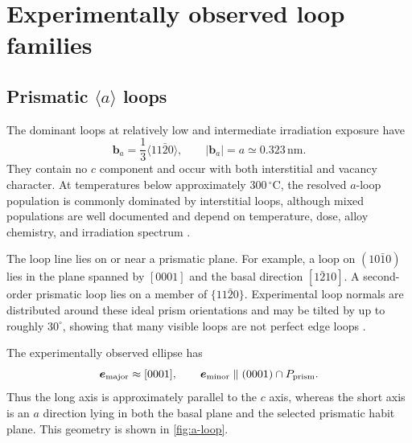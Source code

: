 \documentclass[11pt]{article}
\newcommand{\bvec}{\bm b}
\newcommand{\SI}[2]{\ensuremath{#1\,#2}}
\newcommand{\meter}{\mathrm{m}}
\newcommand{\nano}{\mathrm{n}}
\newcommand{\celsius}{^{\circ}\mathrm{C}}
\begin{document}
\section{Experimentally observed loop families}

\subsection{Prismatic $\langle a\rangle$ loops}

The dominant loops at relatively low and intermediate irradiation exposure have
\begin{equation}
 \bvec_a=\frac13\langle11\bar20\rangle,
 \qquad |\bvec_a|=a\simeq\SI{0.323}{\nano\meter}.
 \label{eq:a-burgers}
\end{equation}
They contain no $c$ component and occur with both interstitial and vacancy character. At temperatures below approximately \SI{300}{\celsius}, the resolved $a$-loop population is commonly dominated by interstitial loops, although mixed populations are well documented and depend on temperature, dose, alloy chemistry, and irradiation spectrum \citep{Jostsons1977Nature,Northwood1979RoundRobin,Liu2020Platelets}.

The loop line lies on or near a prismatic plane. For example, a loop on $(10\bar10)$ lies in the plane spanned by $[0001]$ and the basal direction $[1\bar210]$. A second-order prismatic loop lies on a member of $\{11\bar20\}$. Experimental loop normals are distributed around these ideal prism orientations and may be tilted by up to roughly $30^\circ$, showing that many visible loops are not perfect edge loops \citep{Jostsons1977Nature,Northwood1979RoundRobin}.

The experimentally observed ellipse has
\begin{equation}
 \bm e_{\rm major}\approx[0001],\qquad
 \bm e_{\rm minor}\parallel(0001)\cap P_{\rm prism}.
 \label{eq:a-axes}
\end{equation}
Thus the long axis is approximately parallel to the $c$ axis, whereas the short axis is an $a$ direction lying in both the basal plane and the selected prismatic habit plane. This geometry is shown in \cref{fig:a-loop}.
\end{document}
